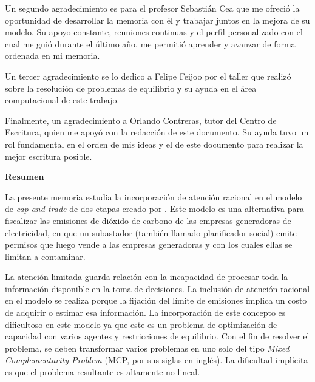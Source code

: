 Un segundo agradecimiento es para el profesor Sebastián Cea que me ofreció la oportunidad de desarrollar la memoria con él y trabajar juntos en la mejora de su modelo. Su apoyo constante, reuniones continuas y el perfil personalizado con el cual me guió durante el último año, me permitió aprender y avanzar de forma ordenada en mi memoria. 
\vspace{2.5mm}

Un tercer agradecimiento se lo dedico a Felipe Feijoo por el taller que realizó sobre la resolución de problemas de equilibrio y su ayuda en el área computacional de este trabajo.
\vspace{2.5mm}

Finalmente, un agradecimiento a Orlando Contreras, tutor del Centro de Escritura, quien me apoyó con la redacción de este documento. Su ayuda tuvo un rol fundamental en el orden de mis ideas y el de este documento para realizar la mejor escritura posible.




  \cleardoublepage
   
  \begin{center} \Large \textbf{Resumen} \end{center}
La presente memoria estudia la incorporación de atención racional en el modelo de \textit{cap and trade} de dos etapas creado por . Este modelo es una alternativa para fiscalizar las emisiones de dióxido de carbono de las empresas generadoras de electricidad, en que un subastador (también llamado planificador social) emite permisos que luego vende a las empresas generadoras y con los cuales ellas se limitan a contaminar.
\vspace{2.5mm}

La atención limitada guarda relación con la incapacidad de procesar toda la información disponible en la toma de decisiones. La inclusión de atención racional en el modelo se realiza porque la fijación del límite de emisiones implica un costo de adquirir o estimar esa información. La incorporación de este concepto es dificultoso en este modelo ya que este es un problema de optimización de capacidad con varios agentes y restricciones de equilibrio. Con el fin de resolver el problema, se deben transformar varios problemas en uno solo del tipo \textit{Mixed Complementarity Problem} (MCP, por sus siglas en inglés). La dificultad implícita es que el problema resultante es altamente no lineal.
\vspace{2.5mm}

